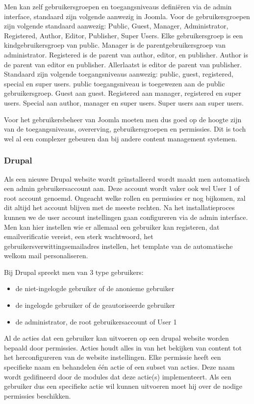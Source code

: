 Men kan zelf gebruikersgroepen en toegangsniveaus definiëren via de admin interface, standaard zijn volgende aanwezig in Joomla. Voor de gebruikersgroepen zijn volgende standaard aanwezig: Public, Guest, Manager, Administrator, Registered, Author, Editor, Publisher, Super Users. Elke gebruikersgroep is een kindgebruikersgroep van public. Manager is de parentgebruikersgroep van administrator. Registered is de parent van author, editor, en publisher. Author is de parent van editor en publisher. Allerlaatst is editor de parent van publisher. Standaard zijn volgende toegangsniveaus aanwezig: public, guest, registered, special en super users. public toegangsniveau is toegewezen aan de public gebruikersgroep. Guest aan guest. Registered aan manager, registered en super users. Special aan author, manager en super users. Super users aan super users.

Voor het gebruikersbeheer van Joomla moeten men dus goed op de hoogte zijn van de toegangsniveaus, overerving, gebruikersgroepen en permissies. Dit is toch wel al een complexer gebeuren dan bij andere content management systemen.
\subsubsection{Drupal}
Als een nieuwe Drupal website wordt geïnstalleerd wordt maakt men automatisch een admin gebruikersaccount aan. Deze account wordt vaker ook wel User 1 of root account genoemd. Ongeacht welke rollen en permissies er nog bijkomen, zal dit altijd het account blijven met de meeste rechten. Na het installatieproces kunnen we de user account instellingen gaan configureren via de admin interface. Men kan hier instellen wie er allemaal een gebruiker kan registeren, dat emailverificatie vereist, een sterk wachtwoord, het gebruikersverwittingsemailadres instellen, het template van de automatische welkom mail personaliseren.

Bij Drupal spreekt men van 3 type gebruikers:
\begin{itemize}
	\item de niet-ingelogde gebruiker of de anonieme gebruiker
	\item de ingelogde gebruiker of de geautoriseerde gebruiker
	\item de administrator, de root gebruikersaccount of User 1
\end{itemize}

Al de acties dat een gebruiker kan uitvoeren op een drupal website worden bepaald door permissies. Acties houdt alles in van het bekijken van content tot het herconfigureren van de website instellingen. Elke permissie heeft een specifieke naam en behandelen één actie of een subset van acties. Deze naam wordt gedifineerd door de modules dat deze actie(s) implementeert. Als een gebruiker dus een specifieke actie wil kunnen uitvoeren moet hij over de nodige permissies beschikken.


